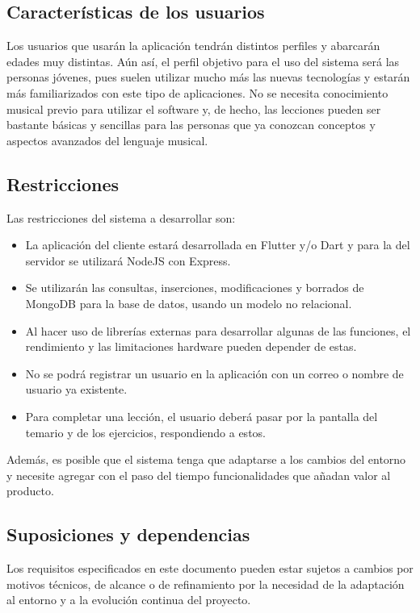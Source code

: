 \subsection{Características de los usuarios}
Los usuarios que usarán la aplicación tendrán distintos perfiles y abarcarán edades muy distintas. Aún así,
el perfil objetivo para el uso del sistema será las personas jóvenes, pues suelen utilizar mucho más las nuevas tecnologías
y estarán más familiarizados con este tipo de aplicaciones. No se necesita conocimiento musical previo para utilizar el software y,
de hecho, las lecciones pueden ser bastante básicas y sencillas para las personas que ya conozcan conceptos y aspectos avanzados del lenguaje musical.


\subsection{Restricciones}

Las restricciones del sistema a desarrollar son:
\begin{itemize}
    \item La aplicación del cliente estará desarrollada en Flutter y/o Dart y para la del servidor se utilizará NodeJS con Express.
    \item Se utilizarán las consultas, inserciones, modificaciones y borrados de MongoDB para la base de datos, usando un modelo no relacional.
    \item Al hacer uso de librerías externas para desarrollar algunas de las funciones, el rendimiento y las limitaciones hardware pueden depender de estas.
    \item No se podrá registrar un usuario en la aplicación con un correo o nombre de usuario ya existente.
    \item Para completar una lección, el usuario deberá pasar por la pantalla del temario y de los ejercicios, respondiendo a estos.
\end{itemize}


Además, es posible que el sistema tenga que adaptarse a los cambios del entorno y necesite agregar con el paso del tiempo funcionalidades que añadan valor
al producto.


\subsection{Suposiciones y dependencias}
Los requisitos especificados en este documento pueden estar sujetos a cambios por motivos técnicos, de alcance o de refinamiento por la necesidad de la adaptación
al entorno y a la evolución continua del proyecto.

